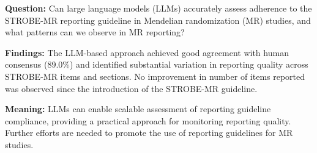 \textbf{Question:}
Can large language models (LLMs) accurately assess adherence to the STROBE-MR reporting guideline in Mendelian randomization (MR) studies, and what patterns can we observe in MR reporting?

\textbf{Findings:}
The LLM-based approach achieved good agreement with human consensus (89.0\%) and identified substantial variation in reporting quality across STROBE-MR items and sections. No improvement in number of items reported was observed since the introduction of the STROBE-MR guideline.

\textbf{Meaning:}
LLMs can enable scalable assessment of reporting guideline compliance, providing a practical approach for monitoring reporting quality. Further efforts are needed to promote the use of reporting guidelines for MR studies.